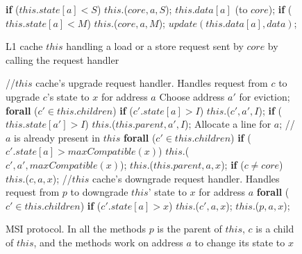 
\begin{figure}
\small
\begin{algorithmic}
    \State \textbf{if} ($this.state[a] < S$)
    \State \;\;\;\; \call{} $this.$\uReq($core, a, S$);
    \State \send{} $this.data[a]$ (to $core$);
    \State \textbf{if} ($this.state[a] < M$)
    \State \;\;\;\; \call{} $this.$\uReq($core, a, M$);
    \State $update(this.data[a], data)$;
  \EndIf
\EndProc
\end{algorithmic}
\caption{L1 cache $this$ handling a load or a store request sent by $core$ by
calling the request handler}
\label{coreHandle}
\end{figure}




\begin{figure}
\small

\begin{algorithmic}
\State //$this$ cache's upgrade request handler. Handles request from $c$ to upgrade $c$'s state to $x$ for address $a$
        \State Choose address $a'$ for eviction;
        \State \textbf{forall} ($c' \in this.children$)
        \State \;\;\;\; \textbf{if} ($c'.state[a] > I$)
        \State \;\;\;\;\;\;\;\; \call{} $this.$\dReqL($c', a', I$);
        \State \textbf{if} ($this.state[a'] > I$)
        \State \;\;\;\; \call{} $this.$\dResp{}($this.parent, a', I$);
      \EndIf
      \State Allocate a line for $a$;
    \EndIf
    \State // $a$ is already present in $this$
    \State \textbf{forall} ($c' \in this.children$)
    \State \;\;\;\; \textbf{if} ($c'.state[a] > maxCompatible(x)$)
    \State \;\;\;\;\;\;\;\; \call{} $this.$\dReqL($c', a', maxCompatible(x)$);
    \State \call{} $this.$\uReqL{}($this.parent, a, x$);
  \State \textbf{if} ($c \neq core$)
  \State \;\;\;\; \call{} $this$.\uResp{}($c, a, x$);
  \EndIf
\EndProc
\State //$this$ cache's downgrade request handler. Handles request from 
$p$ to downgrade $this$' state to $x$ for address $a$ 
    \State \textbf{forall} ($c' \in this.children$)
    \State \;\;\;\; \textbf{if} ($c'.state[a] > x$)
    \State \;\;\;\;\;\;\;\; \call{} $this.$\dReqL($c', a, x$);
    \State \call{} $this.$\dResp($p, a, x$);
  \EndIf
\EndProc
\end{algorithmic}
\caption{MSI protocol. In all the methods $p$ is the parent of $this$, $c$ is a child of $this$, and the methods work on address $a$ to change its state to $x$}
\label{msi-template}
\end{figure}

